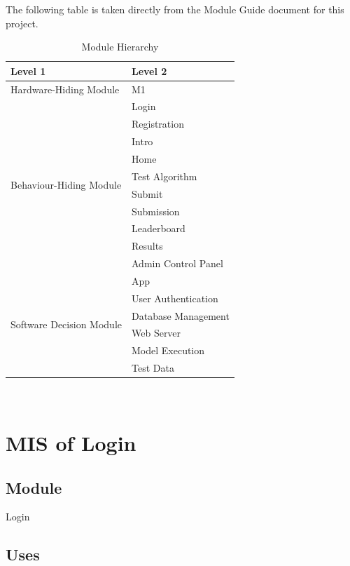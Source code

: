 \documentclass[12pt, titlepage]{article}
\begin{document}
The following table is taken directly from the Module Guide document for this project.

\begin{table}[h!]
\centering
\begin{tabular}{p{} p{}}
\toprule
\textbf{Level 1} & \textbf{Level 2}\\
\midrule

{Hardware-Hiding Module}
& M1\\
\midrule

\multirow{10}{0.3\textwidth}{Behaviour-Hiding Module} 
& Login\\
& Registration\\
& Intro\\
& Home\\
& Test Algorithm\\
& Submit\\
& Submission\\
& Leaderboard\\
& Results\\
& Admin Control Panel\\
\midrule

\multirow{6}{0.3\textwidth}{Software Decision Module} 
& App\\
& User Authentication\\
& Database Management\\
& Web Server\\
& Model Execution\\
& Test Data\\
\bottomrule

\end{tabular}
\caption{Module Hierarchy}
\label{TblMH}
\end{table}

~\newpage
~\newpage

\section{MIS of Login} \label{LoginModule}

\subsection{Module}

Login

\subsection{Uses}
\end{document}
